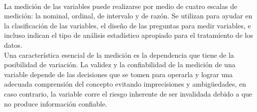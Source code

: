 \documentclass[12pt,hidelinks]{article}
\begin{document}
	\paragraph{}La medición de las variables puede realizarse por medio de cuatro escalas de medición: la nominal, ordinal, de intervalo y de razón. Se utilizan para ayudar en la clasificación de las variables, el diseño de las preguntas para medir variables, e incluso indican el tipo de análisis estadístico apropiado para el tratamiento de los datos.\\
	\vspace{2mm}
	Una característica esencial de la medición es la dependencia que tiene de la posibilidad de variación. La validez y la confiabilidad de la medición de una variable depende de las decisiones que se tomen para operarla y lograr una adecuada comprensión del concepto evitando imprecisiones y ambigüedades, en caso  contrario, la variable corre el riesgo inherente de ser invalidada debido a que no produce información confiable.
\end{document}
